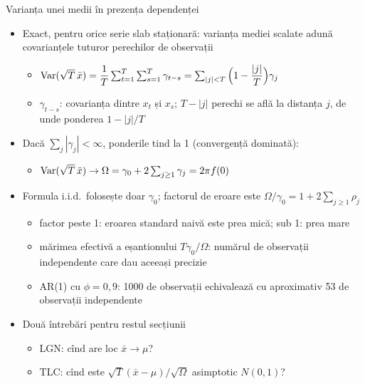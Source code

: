 \begin{frame}{Varianța unei medii în prezența dependenței}
\itemsize{\small}
\begin{itemize}
    \item Exact, pentru orice serie slab staționară: varianța mediei scalate adună covarianțele tuturor perechilor de observații
    \begin{itemize}
        \item $\text{Var}(\sqrt{T}\,\bar x) = \dfrac{1}{T}\sum_{t=1}^{T}\sum_{s=1}^{T}\gamma_{t-s} = \sum_{|j| < T}\Big(1 - \dfrac{|j|}{T}\Big)\gamma_j$
        \item $\gamma_{t-s}$: covarianța dintre $x_t$ și $x_s$; $T - |j|$ perechi se află la distanța $j$, de unde ponderea $1 - |j|/T$
    \end{itemize}
    \item Dacă $\sum_j |\gamma_j| < \infty$, ponderile tind la 1 (convergență dominată):
    \begin{itemize}
        \item $\text{Var}(\sqrt{T}\,\bar x) \to \Omega = \gamma_0 + 2\sum_{j\ge 1}\gamma_j = 2\pi f(0)$
    \end{itemize}
    \item Formula i.i.d.\ folosește doar $\gamma_0$; factorul de eroare este $\Omega/\gamma_0 = 1 + 2\sum_{j\ge1}\rho_j$
    \begin{itemize}
        \item factor peste 1: eroarea standard naivă este prea mică; sub 1: prea mare
        \item mărimea efectivă a eșantionului $T\gamma_0/\Omega$: numărul de observații independente care dau aceeași precizie
        \item AR(1) cu $\phi = 0{,}9$: 1000 de observații echivalează cu aproximativ 53 de observații independente
    \end{itemize}
    \item Două întrebări pentru restul secțiunii
    \begin{itemize}
        \item LGN: cînd are loc $\bar x \to \mu$?
        \item TLC: cînd este $\sqrt{T}(\bar x - \mu)/\sqrt{\Omega}$ asimptotic $N(0,1)$?
    \end{itemize}
\end{itemize}
\end{frame}

